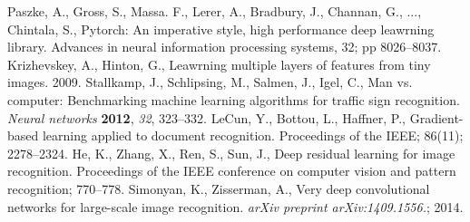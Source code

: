 \documentclass[journal,article,submit,moreauthors,pdftex]{Definitions/mdpi}
\begin{document}
\begin{thebibliography}{999}
Paszke, A., Gross, S., Massa. F., Lerer, A., Bradbury, J., Channan, G., ..., Chintala, S., Pytorch: An imperative style, high performance deep leawrning library. Advances in neural information processing systems, 32; pp 8026--8037.
Krizhevskey, A., Hinton, G., Leawrning multiple layers of features from tiny images. 2009.
Stallkamp, J., Schlipsing, M., Salmen, J., Igel, C., Man vs. computer: Benchmarking machine learning algorithms for traffic sign recognition. {\em Neural networks} {\bf 2012}, {\em 32}, 323--332.
LeCun, Y., Bottou, L., Haffner, P., Gradient-based learning applied to document recognition. Proceedings of the IEEE; 86(11); 2278--2324.
He, K., Zhang, X., Ren, S., Sun, J., Deep residual learning for image recognition. Proceedings of the IEEE conference on computer vision and pattern recognition; 770--778.
Simonyan, K., Zisserman, A., Very deep convolutional networks for large-scale image recognition. \textit{arXiv preprint arXiv:1409.1556.}; 2014.
\end{thebibliography}
\end{document}
